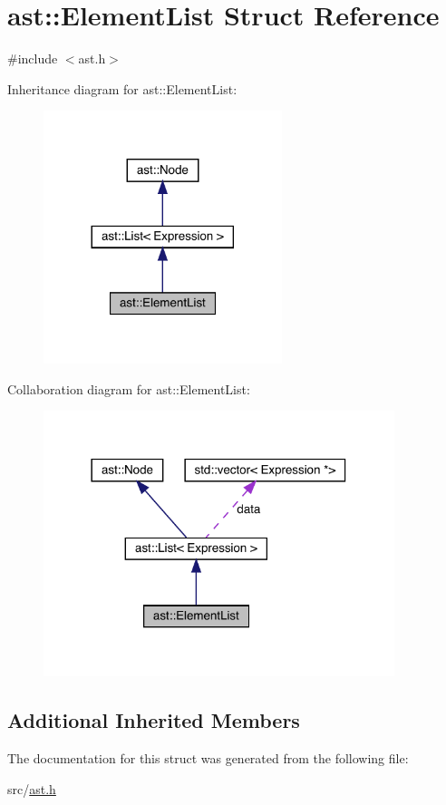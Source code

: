 \hypertarget{structast_1_1_element_list}{}\section{ast\+:\+:Element\+List Struct Reference}
\label{structast_1_1_element_list}


{\ttfamily \#include $<$ast.\+h$>$}



Inheritance diagram for ast\+:\+:Element\+List\+:
\nopagebreak
\begin{figure}[H]
\begin{center}
\leavevmode
\includegraphics[width=197pt]{structast_1_1_element_list__inherit__graph}
\end{center}
\end{figure}


Collaboration diagram for ast\+:\+:Element\+List\+:
\nopagebreak
\begin{figure}[H]
\begin{center}
\leavevmode
\includegraphics[width=290pt]{structast_1_1_element_list__coll__graph}
\end{center}
\end{figure}
\subsection*{Additional Inherited Members}


The documentation for this struct was generated from the following file\+:\begin{DoxyCompactItemize}
\item 
src/\hyperlink{ast_8h}{ast.\+h}\end{DoxyCompactItemize}
